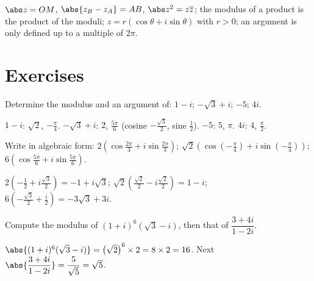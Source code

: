 \begin{keypoint}
$\abs z=OM$, $\abs{z_B-z_A}=AB$, $\abs z^2=z\overline z$; the modulus of a product is the product of the moduli; $z=r(\cos\theta+i\sin\theta)$ with $r>0$; an argument is only defined up to a multiple of $2\pi$.
\end{keypoint}

\mxnewpage
\section{Exercises}
\begin{exercise}
Determine the modulus and an argument of: $1-i$; $-\sqrt3+i$; $-5$; $4i$.
\end{exercise}
\begin{solution}
$1-i$: $\sqrt2$, $-\frac\pi4$. $-\sqrt3+i$: $2$, $\frac{5\pi}6$ (cosine $-\frac{\sqrt3}2$, sine $\frac12$). $-5$: $5$, $\pi$. $4i$: $4$, $\frac\pi2$.
\end{solution}

\begin{exercise}
Write in algebraic form: $2\left(\cos\frac{2\pi}3+i\sin\frac{2\pi}3\right)$; $\sqrt2\left(\cos\left(-\frac\pi4\right)+i\sin\left(-\frac\pi4\right)\right)$; $6\left(\cos\frac{5\pi}6+i\sin\frac{5\pi}6\right)$.
\end{exercise}
\begin{solution}
$2\left(-\frac12+i\frac{\sqrt3}2\right)=-1+i\sqrt3$; $\sqrt2\left(\frac{\sqrt2}2-i\frac{\sqrt2}2\right)=1-i$; $6\left(-\frac{\sqrt3}2+\frac i2\right)=-3\sqrt3+3i$.
\end{solution}

\begin{exercise}
Compute the modulus of $(1+i)^6\left(\sqrt3-i\right)$, then that of $\dfrac{3+4i}{1-2i}$.
\end{exercise}
\begin{solution}
$\abs{(1+i)^6(\sqrt3-i)}=\left(\sqrt2\right)^6\times2=8\times2=16$. Next $\abs{\dfrac{3+4i}{1-2i}}=\dfrac{5}{\sqrt5}=\sqrt5$.
\end{solution}


